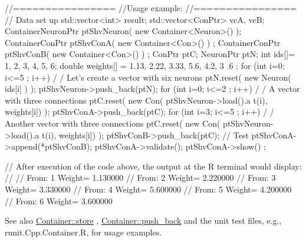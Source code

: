 \begin{DoxyCode}
        //================
        //Usage example:
        //================
        // Data set up
                                std::vector<int> result;
                                std::vector<ConPtr> vcA, vcB;
                                ContainerNeuronPtr      ptShvNeuron( new 
      Container<Neuron>() );
                                ContainerConPtr ptShvConA( new Container<Con>() )
      ;
                                ContainerConPtr ptShvConB( new Container<Con>() )
      ;
                                ConPtr  ptC;
                                NeuronPtr ptN;
                                int ids[]= {1, 2, 3, 4, 5, 6};
                                double weights[] = {1.13, 2.22, 3.33, 5.6, 4.2, 3
      .6 };
                                for (int i=0; i<=5 ; i++) {                             /
      / Let's create a vector with six neurons
                                        ptN.reset( new Neuron( ids[i] ) );
                                        ptShvNeuron->push_back(ptN);
                                }
                                for (int i=0; i<=2 ; i++) {                             /
      / A vector with three connections
                                        ptC.reset( new Con( ptShvNeuron->load().a
      t(i), weights[i]) );
                                        ptShvConA->push_back(ptC);
                                }
                                for (int i=3; i<=5 ; i++) {                             /
      / Another vector with three connections
                                        ptC.reset( new Con( ptShvNeuron->load().a
      t(i), weights[i]) );
                                        ptShvConB->push_back(ptC);
                                }
        // Test
                                ptShvConA->append(*ptShvConB);
                                ptShvConA->validate();
                                ptShvConA->show() ;

        // After execution of the code above, the output at the R terminal would 
      display:
        //
        //  From:        1       Weight=         1.130000
        //      From:    2       Weight=         2.220000
        //      From:    3       Weight=         3.330000
        //      From:    4       Weight=         5.600000
        //      From:    5       Weight=         4.200000
        //      From:    6       Weight=         3.600000
\end{DoxyCode}


\begin{DoxySeeAlso}{See also}
\hyperlink{class_container_a601371159ddfee9ab29b676207a0cf75}{Container::store} , \hyperlink{class_container_afd87c69cb799ed7b434c29090083a285}{Container::push\_\-back} and the unit test files, e.g., runit.Cpp.Container.R, for usage examples. 
\end{DoxySeeAlso}


